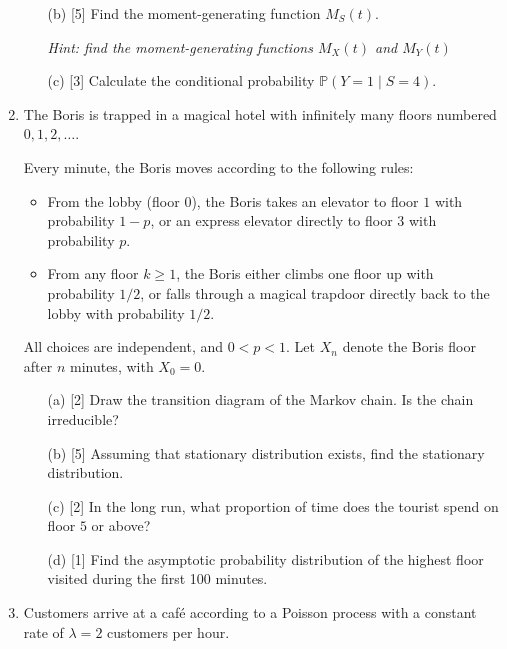 \begin{enumerate}
\begin{enumerate}
    \item[(b)] [5] Find the
    moment-generating function $M_S(t)$.
    
    \textit{Hint: find the moment-generating functions $M_X(t)$ and $M_Y(t)$}

    \item[(c)] [3]
    Calculate the conditional probability
    $
    \mathbb{P}(Y=1 \mid S=4).
    $

\end{enumerate}

\item
The Boris is trapped in a magical hotel with infinitely many
floors numbered $0,1,2,\ldots$.

Every minute, the Boris moves according to the following rules:
\begin{itemize}
    \item From the lobby (floor $0$), the Boris takes an
    elevator to floor $1$ with probability $1-p$, or an
    express elevator directly to floor $3$ with probability $p$.
    
    \item From any floor $k\geqslant 1$, the Boris either climbs
    one floor up with probability $1/2$, or falls through
    a magical trapdoor directly back to the lobby
    with probability $1/2$.
\end{itemize}

All choices are independent, and $0<p<1$.
Let $X_n$ denote the Boris floor after $n$ minutes,
with $X_0=0$.

\begin{enumerate}
    \item[(a)] [2] Draw the transition diagram of the
    Markov chain. Is the chain irreducible?

    \item[(b)] [5] Assuming that stationary distribution exists, find the stationary distribution.

    \item[(c)] [2] In the long run, what proportion of time
    does the tourist spend on floor $5$ or above?

    \item[(d)] [1] Find the asymptotic probability distribution of the highest floor visited during the first 100 minutes.
\end{enumerate}

\item 
Customers arrive at a café according to a Poisson process with a constant rate of \(\lambda=2\) customers per hour.


\end{enumerate}
